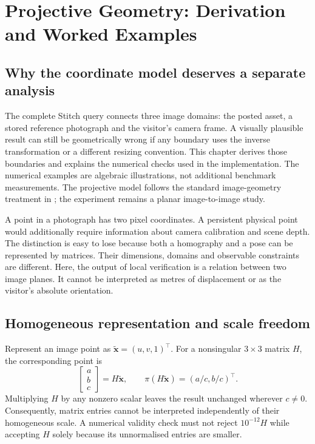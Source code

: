 \chapter{Projective Geometry: Derivation and Worked Examples}\label{ch:projective-foundations}
\section{Why the coordinate model deserves a separate analysis}
The complete Stitch query connects three image domains: the posted asset, a stored reference photograph and the visitor's camera frame. A visually plausible result can still be geometrically wrong if any boundary uses the inverse transformation or a different resizing convention. This chapter derives those boundaries and explains the numerical checks used in the implementation. The numerical examples are algebraic illustrations, not additional benchmark measurements. The projective model follows the standard image-geometry treatment in \citet{hartley2004}; the experiment remains a planar image-to-image study.

A point in a photograph has two pixel coordinates. A persistent physical point would additionally require information about camera calibration and scene depth. The distinction is easy to lose because both a homography and a pose can be represented by matrices. Their dimensions, domains and observable constraints are different. Here, the output of local verification is a relation between two image planes. It cannot be interpreted as metres of displacement or as the visitor's absolute orientation.

\section{Homogeneous representation and scale freedom}
Represent an image point as $\widetilde{\mathbf x}=(u,v,1)^\top$. For a nonsingular $3\times3$ matrix $H$, the corresponding point is
\begin{equation}
 \begin{bmatrix}a\\b\\c\end{bmatrix}=H\widetilde{\mathbf x},
 \qquad \pi(H\widetilde{\mathbf x})=(a/c,b/c)^\top.
\end{equation}
Multiplying $H$ by any nonzero scalar leaves the result unchanged wherever $c\ne0$. Consequently, matrix entries cannot be interpreted independently of their homogeneous scale. A numerical validity check must not reject $10^{-12}H$ while accepting $H$ solely because its unnormalised entries are smaller.

